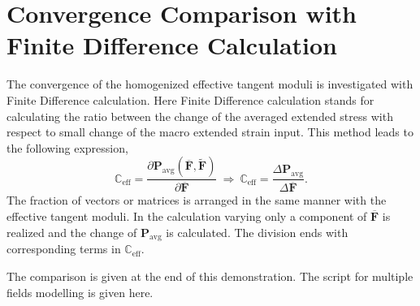 \section{Convergence Comparison with Finite Difference Calculation}
The convergence of the homogenized effective tangent moduli is investigated with Finite Difference calculation. Here Finite Difference calculation stands for calculating the ratio between the change of the averaged extended stress with respect to small change of the macro extended strain input. This method leads to the following expression, 
\begin{equation}
\mathbb{C}_{\text{eff}} = \dfrac{\partial \mathbf{P}_{\text{avg}} \left( \overbar{\mathbf{F}}, \widetilde{\mathbf{F}} \right)}{\partial \overbar{\mathbf{F}}} \ \Rightarrow \ \mathbb{C}_{\text{eff}} = \dfrac{\Delta \mathbf{P}_{\text{avg}}}{\Delta \overbar{\mathbf{F}}}.
\end{equation}
The fraction of vectors or matrices is arranged in the same manner with the effective tangent moduli. In the calculation varying only a component of $\overbar{\mathbf{F}}$ is realized and the change of $\mathbf{P}_{\text{avg}}$ is calculated. The division ends with corresponding terms in $\mathbb{C}_{\text{eff}}$.

The comparison is given at the end of this demonstration. The script for multiple fields modelling is given here.

